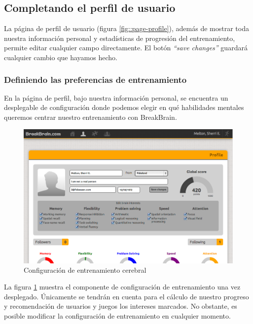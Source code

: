 \subsection{Completando el perfil de usuario}

La página de perfil de usuario (figura \ref{fig::page-profile}), además de mostrar toda nuestra información personal y estadísticas de progresión del entrenamiento, permite editar cualquier campo directamente. El botón {\it ``save changes''} guardará cualquier cambio que hayamos hecho.

\subsubsection{Definiendo las preferencias de entrenamiento}

En la página de perfil, bajo nuestra información personal, se encuentra un desplegable de configuración donde podemos elegir en qué habilidades mentales queremos centrar nuestro entrenamiento con BreakBrain.

\begin{figure}[h]
  \begin{center}
    \includegraphics[width=\textwidth]{./images/training-settings.png}
  \end{center}  
  \caption{Configuración de entrenamiento cerebral}
  \label{fig::training-settings}
\end{figure}

La figura \ref{fig::training-settings} muestra el componente de configuración de entrenamiento una vez desplegado. Únicamente se tendrán en cuenta para el cálculo de nuestro progreso y recomendación de usuarios y juegos los intereses marcados. No obstante, es posible modificar la configuración de entrenamiento en cualquier momento.

